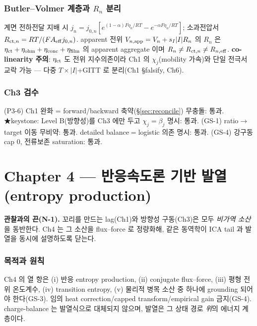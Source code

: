 \section{Butler--Volmer 계층과 $R_n$ 분리}\label{sec:ch3_Rn}
계면 전하전달 지배 시 $j_n=j_{0,n}[e^{(1-\alpha)F\eta_n/RT}-e^{-\alpha F\eta_n/RT}]$; 소과전압서
$R_{\mathrm{ct},n}=RT/(FA_{\mathrm{eff}} j_{0,n})$. apparent 전위
$V_{n,\mathrm{app}}=V_n+s_I|I|R_n$ 의 $R_n$ 은 $\eta_{\mathrm{ct}}+\eta_{\mathrm{ohm}}+\eta_{\mathrm{conc}}+\eta_{\mathrm{film}}$
의 apparent aggregate 이며 $R_n\ne R_{\mathrm{ct},n}\ne R_{n,\mathrm{eff}}$. \textbf{co-linearity 주의}: $\eta_{\mathrm{ct}}$
도 전위 지수의존이라 Ch1 의 $\chi_j$(mobility 가속)와 단일 전극서 교락 가능 — 다중 $T\times|I|$+GITT 로
분리(Ch1 \S falsify, Ch6).

\section{Ch3 검수}\label{sec:ch3_check}
{\small (P3-6) Ch1 완화 = forward/backward 축약(\S\ref{sec:reconcile}) 무충돌: 통과. ★keystone:
Level B(방향성)를 Ch3 에만 두고 $\chi_j=\beta_j$ 명시: 통과. (GS-1) ratio$\to$target 이동 무비약:
통과. detailed balance$=$logistic 의존 명시: 통과. (GS-4) 강구동 cap 0, 전류보존 saturation: 통과.}

\part*{Chapter 4 — 반응속도론 기반 발열 (entropy production)}
\setcounter{section}{0}

\begin{anchorbox}
\textbf{관찰과의 끈(N-1).} 꼬리를 만드는 lag(Ch1)와 방향성 구동(Ch3)은 모두 \emph{비가역 소산}을
동반한다. Ch4 는 그 소산을 flux--force 로 정량화해, 같은 동역학이 ICA tail 과 발열을 동시에
설명하도록 닫는다.
\end{anchorbox}

\section{목적과 원칙}\label{sec:ch4_scope}
Ch4 의 열 항은 (i) 반응 entropy production, (ii) conjugate flux--force, (iii) 평형 전위 온도계수,
(iv) transition entropy, (v) 물리적 병목 소산 중 하나에 grounding 되어야 한다(GS-3). 임의 heat
correction/capped transform/empirical gain 금지(GS-4). charge-balance 는 발열식으로 대체되지 않으며,
발열은 그 상태 경로 \emph{위}의 에너지 계층이다.


